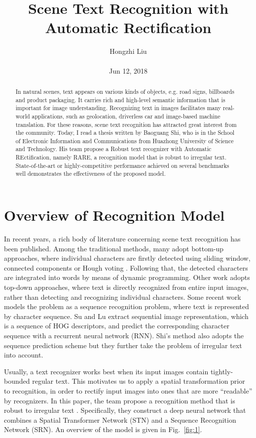 \documentclass[10pt,twocolumn,letterpaper]{article}
\title{Scene Text Recognition with Automatic Rectification}
\author{Hongzhi Liu\\\\
Jun 12, 2018}
\begin{document}
\maketitle
\begin{abstract}
	In natural scenes, text appears on various kinds of objects, e.g. road signs, billboards and product packaging. It carries rich and high-level semantic information that is important for image understanding. Recognizing text in images facilitates many real-world applications, such as geolocation, driverless car and image-based machine translation. For these reasons, scene text recognition has attracted great interest from the community. Today, I read a thesis written by Baoguang Shi, who is in the School of Electronic Information and Communications from Huazhong University of Science and Technology. His team propose a Robust text recognizer with Automatic REctification, namely RARE, a recognition model that is robust to irregular text. State-of-the-art or highly-competitive performance achieved on several benchmarks well demonstrates the effectiveness of the proposed model.
\end{abstract}
\section{Overview of Recognition Model}

In recent years, a rich body of literature concerning scene text recognition has been published. Among the traditional methods, many adopt bottom-up approaches, where individual characters are firstly detected using sliding window, connected components or Hough voting \cite{yao2014strokelets}. Following that, the detected characters are integrated into words by means of dynamic programming. Other work adopts top-down approaches, where text is directly recognized from entire input images, rather than detecting and recognizing individual characters. Some recent work models the problem as a sequence recognition problem, where text is represented by character sequence. Su and Lu \cite{su2014accurate} extract sequential image representation, which is a sequence of HOG \cite{dalal2005histograms} descriptors, and predict the corresponding character sequence with a recurrent neural network (RNN). Shi's method also adopts the sequence prediction scheme but they further take the problem of irregular text into account.

Usually, a text recognizer works best when its input images contain tightly-bounded regular text. This motivates us to apply a spatial transformation prior to recognition, in order to rectify input images into ones that are more ``readable'' by recognizers. In this paper, the team propose a recognition method that is robust to irregular text \cite{shi2016robust}. Specifically, they construct a deep neural network that combines a Spatial Transformer Network (STN) \cite{jaderberg2015spatial} and a Sequence Recognition Network (SRN). An overview of the model is given in Fig.~\ref{fig:1}.
\end{document}
